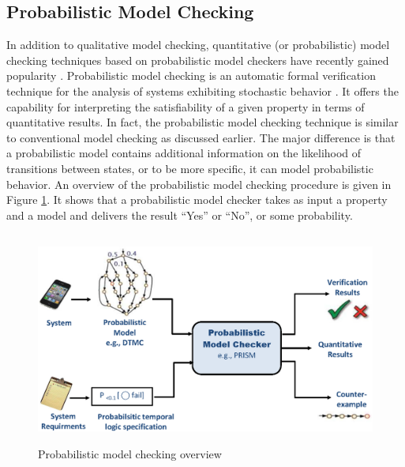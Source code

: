 \subsection{Probabilistic Model Checking} \label{sec:pro-Model-Checking-cha2}

In addition to qualitative model checking, quantitative (or probabilistic) model checking techniques based on probabilistic model checkers have recently gained popularity \cite{Baier2008}. Probabilistic model checking is an automatic formal verification technique for the analysis of systems exhibiting stochastic behavior \cite{Hinton2006}. It offers the capability for interpreting the satisfiability of a given property in terms of quantitative results. In fact, the probabilistic model checking technique is similar to conventional model checking as discussed earlier. The major difference is that a probabilistic model contains additional information on the likelihood of transitions between states, or to be more specific, it can model probabilistic behavior. An overview of the probabilistic model checking procedure is given in Figure \ref{fig:prob-model-checking-cha2}. It shows that a probabilistic model checker takes as input a property and a model and delivers the result ``Yes'' or ``No'', or some probability.


\begin{figure}[t]
                \begin{center}
                \includegraphics[width=12cm, height=7cm]{chap2/img/modelchecking2.eps}
                \end{center}
                \caption{Probabilistic model checking overview}
                \label{fig:prob-model-checking-cha2}
                \end{figure}


